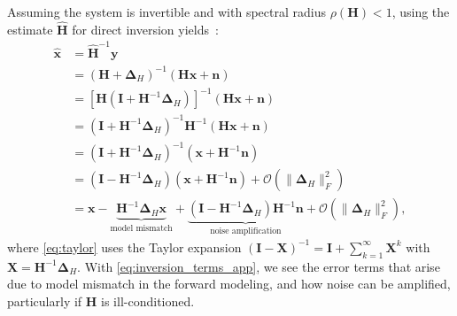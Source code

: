 \noindent Assuming the system is invertible and with spectral radius $\rho(\bm{H}) < 1$, using the estimate $\bm{\hat{H}}$ for direct inversion yields~\cite{9546648,9157433}:
\begin{align}
    \bm{\hat{x}} &= \bm{\hat{H}}^{-1} \bm{y} \nonumber \\
    &=(\bm{H}+\bm{\Delta}_H)^{-1} (\bm{H}\bm{x} + \bm{n}) \nonumber \\ 
    &=[\bm{H} (\bm{I}+\bm{H}^{-1}\bm{\Delta}_H)]^{-1} (\bm{H}\bm{x} + \bm{n}) \nonumber \\ 
    &=(\bm{I}+\bm{H}^{-1}\bm{\Delta}_H)^{-1} \bm{H}^{-1} (\bm{H}\bm{x} + \bm{n}) \nonumber \\
    &=(\bm{I}+ \bm{H}^{-1}\bm{\Delta}_H)^{-1} (\bm{x} + \bm{H}^{-1}\bm{n}) \nonumber \\
   &=
   \label{eq:taylor}
   (\bm{I} - \bm{H}^{-1}\bm{\Delta}_H) (\bm{x} + \bm{H}^{-1}\bm{n}) + \mathcal{O}(\| \bm{\Delta}_H\|_F^2)\\
   \label{eq:inversion_terms_app}
   &= \bm{x} - \underbrace{\bm{H}^{-1}\bm{\Delta}_H \bm{x}}_{\text{model mismatch}} + \underbrace{(\bm{I} - \bm{H}^{-1}\bm{\Delta}_H)\bm{H}^{-1}\bm{n}}_{\text{noise amplification}} + \mathcal{O}(\| \bm{\Delta}_H\|_F^2),
\end{align}
where \cref{eq:taylor}  uses the Taylor expansion $(\bm{I}-\bm{X})^{-1} = \bm{I} + \sum_{k=1}^{\infty} \bm{X}^k$ with $\bm{X} = \bm{H}^{-1}\bm{\Delta}_H$.
With \cref{eq:inversion_terms_app}, we see the error terms that arise due to model mismatch in the forward modeling, and how noise can be amplified, particularly if $\bm{H}$ is ill-conditioned.

